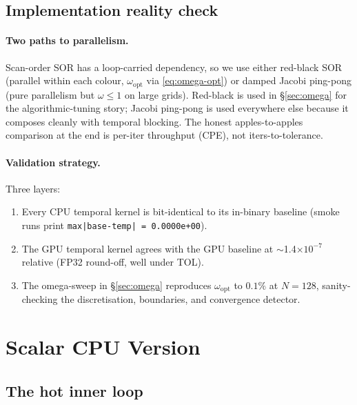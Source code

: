 \documentclass[11pt]{article}
\begin{document}
\subsection{Implementation reality check}
\label{sec:reality-check}

\paragraph{Two paths to parallelism.} Scan-order SOR has a
loop-carried dependency, so we use either red-black SOR (parallel
within each colour, $\omega_{\text{opt}}$ via \eqref{eq:omega-opt})
or damped Jacobi ping-pong (pure parallelism but $\omega \leq 1$ on
large grids). Red-black is used in §\ref{sec:omega} for the
algorithmic-tuning story; Jacobi ping-pong is used everywhere else
because it composes cleanly with temporal blocking. The honest
apples-to-apples comparison at the end is per-iter throughput (CPE),
not iters-to-tolerance.

\paragraph{Validation strategy.} Three layers:
\begin{enumerate}[leftmargin=1.4em,itemsep=2pt,topsep=2pt]
  \item Every CPU temporal kernel is bit-identical to its in-binary
        baseline (smoke runs print
        \texttt{max|base-temp| = 0.0000e+00}).
  \item The GPU temporal kernel agrees with the GPU baseline at
        $\sim$1.4$\times 10^{-7}$ relative (FP32 round-off, well
        under TOL).
  \item The omega-sweep in §\ref{sec:omega} reproduces
        $\omega_{\text{opt}}$ to $0.1\%$ at $N{=}128$, sanity-checking
        the discretisation, boundaries, and convergence detector.
\end{enumerate}

\section{Scalar CPU Version}
\label{sec:cpu}

\subsection{The hot inner loop}
\end{document}
